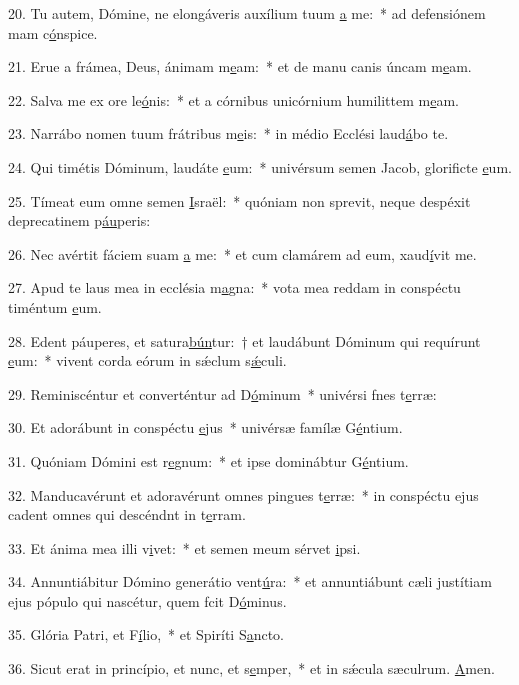 20. Tu autem, Dómine, ne elongáveris auxílium tuum \uline{a} me:~* ad defensiónem mam c\uline{ó}nspice.\par 
21. Erue a frámea, Deus, ánimam m\uline{e}am:~* et de manu canis úncam m\uline{e}am.\par 
22. Salva me ex ore le\uline{ó}nis:~* et a córnibus unicórnium humilittem m\uline{e}am.\par 
23. Narrábo nomen tuum frátribus m\uline{e}is:~* in médio Ecclési laud\uline{á}bo te.\par 
24. Qui timétis Dóminum, laudáte \uline{e}um:~* univérsum semen Jacob, glorificte \uline{e}um.\par 
25. Tímeat eum omne semen \uline{I}sraël:~* quóniam non sprevit, neque despéxit deprecatinem p\uline{áu}peris:\par 
26. Nec avértit fáciem suam \uline{a} me:~* et cum clamárem ad eum, xaud\uline{í}vit me.\par 
27. Apud te laus mea in ecclésia m\uline{a}gna:~* vota mea reddam in conspéctu timéntum \uline{e}um.\par 
28. Edent páuperes, et satura\uline{bún}tur:~† et laudábunt Dóminum qui requírunt \uline{e}um:~* vivent corda eórum in sǽclum s\uline{ǽ}culi.\par 
29. Reminiscéntur et converténtur ad D\uline{ó}minum~* univérsi fnes t\uline{e}rræ:\par 
30. Et adorábunt in conspéctu \uline{e}jus~* univérsæ famílæ G\uline{é}ntium.\par 
31. Quóniam Dómini est r\uline{e}gnum:~* et ipse dominábtur G\uline{é}ntium.\par 
32. Manducavérunt et adoravérunt omnes pingues t\uline{e}rræ:~* in conspéctu ejus cadent omnes qui descéndnt in t\uline{e}rram.\par 
33. Et ánima mea illi v\uline{i}vet:~* et semen meum sérvet \uline{i}psi.\par 
34. Annuntiábitur Dómino generátio vent\uline{ú}ra:~* et annuntiábunt cæli justítiam ejus pópulo qui nascétur, quem fcit D\uline{ó}minus.\par 
35. Glória Patri, et F\uline{í}lio,~* et Spiríti S\uline{a}ncto.\par 
36. Sicut erat in princípio, et nunc, et s\uline{e}mper,~* et in sǽcula sæculrum. \uline{A}men.\par 
